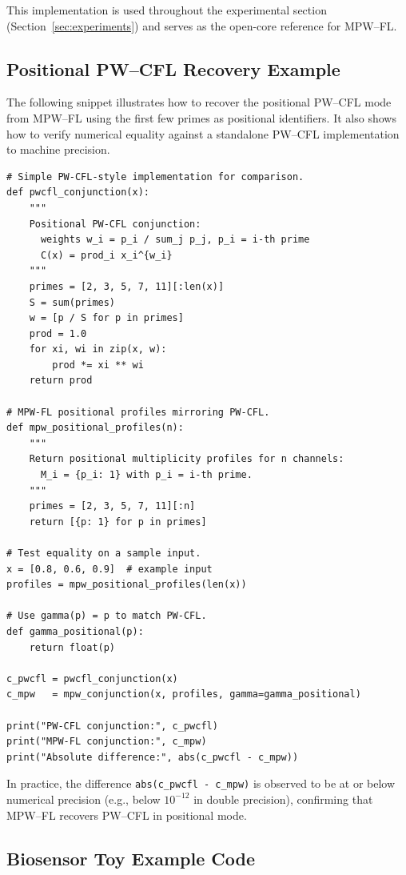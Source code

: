 \documentclass[11pt]{article}
\begin{document}
This implementation is used throughout the experimental section (Section~\ref{sec:experiments}) and serves as the open-core reference for MPW--FL.

\subsection{Positional PW--CFL Recovery Example}
\label{subsec:positional-example}

The following snippet illustrates how to recover the positional PW--CFL mode from MPW--FL using the first few primes as positional identifiers. It also shows how to verify numerical equality against a standalone PW--CFL implementation to machine precision.

\begin{verbatim}
# Simple PW-CFL-style implementation for comparison.
def pwcfl_conjunction(x):
    """
    Positional PW-CFL conjunction:
      weights w_i = p_i / sum_j p_j, p_i = i-th prime
      C(x) = prod_i x_i^{w_i}
    """
    primes = [2, 3, 5, 7, 11][:len(x)]
    S = sum(primes)
    w = [p / S for p in primes]
    prod = 1.0
    for xi, wi in zip(x, w):
        prod *= xi ** wi
    return prod

# MPW-FL positional profiles mirroring PW-CFL.
def mpw_positional_profiles(n):
    """
    Return positional multiplicity profiles for n channels:
      M_i = {p_i: 1} with p_i = i-th prime.
    """
    primes = [2, 3, 5, 7, 11][:n]
    return [{p: 1} for p in primes]

# Test equality on a sample input.
x = [0.8, 0.6, 0.9]  # example input
profiles = mpw_positional_profiles(len(x))

# Use gamma(p) = p to match PW-CFL.
def gamma_positional(p):
    return float(p)

c_pwcfl = pwcfl_conjunction(x)
c_mpw   = mpw_conjunction(x, profiles, gamma=gamma_positional)

print("PW-CFL conjunction:", c_pwcfl)
print("MPW-FL conjunction:", c_mpw)
print("Absolute difference:", abs(c_pwcfl - c_mpw))
\end{verbatim}

In practice, the difference \texttt{abs(c\_pwcfl - c\_mpw)} is observed to be at or below numerical precision (e.g., below $10^{-12}$ in double precision), confirming that MPW--FL recovers PW--CFL in positional mode.

\subsection{Biosensor Toy Example Code}
\label{subsec:biosensor-code}
\end{document}
